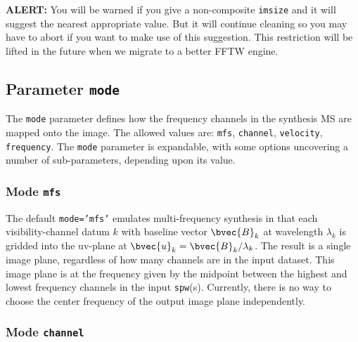 {\bf ALERT:} You will be warned if you give a non-composite
{\tt imsize} and it will suggest the nearest appropriate value.
But it will continue cleaning so you may have to abort if you want
to make use of this suggestion.  This restriction will be lifted
in the future when we migrate to a better FFTW engine.

\subsection{Parameter {\tt mode} }
\label{section:im.pars.mode}

The {\tt mode} parameter defines how the frequency channels in the
synthesis MS are mapped onto the image.  The allowed values are:
{\tt mfs}, {\tt channel}, {\tt velocity}, {\tt frequency}.
The {\tt mode} parameter
is expandable, with some options uncovering a number of
sub-parameters, depending upon its value.

\subsubsection{Mode {\tt mfs} }
\label{section:im.pars.mode.mfs}

The default {\tt mode='mfs'} emulates multi-frequency synthesis in
that each visibility-channel datum $k$ with baseline vector
$\bvec{B}_k$ at wavelength $\lambda_k$ is gridded into the uv-plane at
$\bvec{u}_k = \bvec{B}_k/\lambda_k$.  The result is a single image
plane, regardless of how many channels are in the input dataset.
This image plane is at the frequency given by the midpoint between
the highest and lowest frequency channels in the input {\tt spw}(s).
Currently, there is no way to choose the center frequency of the 
output image plane independently.

\subsubsection{Mode {\tt channel} }
\label{section:im.pars.mode.channel}


